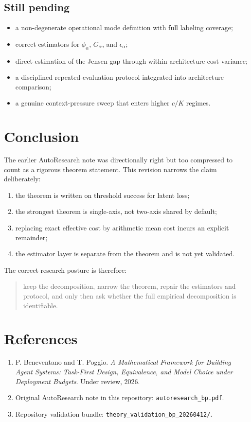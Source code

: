 \documentclass[11pt]{article}
\begin{document}
\subsection*{Still pending}

\begin{itemize}
\item a non-degenerate operational mode definition with full labeling coverage;
\item correct estimators for $\phi_\alpha$, $G_\alpha$, and $\epsilon_\alpha$;
\item direct estimation of the Jensen gap through within-architecture cost variance;
\item a disciplined repeated-evaluation protocol integrated into architecture comparison;
\item a genuine context-pressure sweep that enters higher $c/K$ regimes.
\end{itemize}

\section{Conclusion}

The earlier AutoResearch note was directionally right but too compressed to count as a rigorous
theorem statement. This revision narrows the claim deliberately:

\begin{enumerate}
\item the theorem is written on threshold success for latent loss;
\item the strongest theorem is single-axis, not two-axis shared by default;
\item replacing exact effective cost by arithmetic mean cost incurs an explicit remainder;
\item the estimator layer is separate from the theorem and is not yet validated.
\end{enumerate}

The correct research posture is therefore:

\begin{quote}
keep the decomposition, narrow the theorem, repair the estimators and protocol, and only then ask
whether the full empirical decomposition is identifiable.
\end{quote}

\section*{References}

\begin{enumerate}
\item P. Beneventano and T. Poggio. \emph{A Mathematical Framework for Building Agent Systems:
Task-First Design, Equivalence, and Model Choice under Deployment Budgets}. Under review, 2026.
\item Original AutoResearch note in this repository: \texttt{autoresearch\_bp.pdf}.
\item Repository validation bundle: \texttt{theory\_validation\_bp\_20260412/}.
\end{enumerate}
\end{document}
